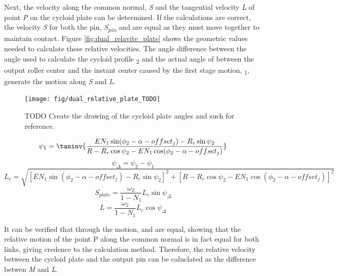 Next, the velocity along the common normal, \textit{S} and the tangential velocity \textit{L} of point \textit{P} on the cycloid plate can be determined. If the calculations are correct, the velocity \textit{S} for both the pin, \textit{S\textsubscript{pin}} and  are equal as they must move together to maintain contact. Figure \ref{fig:dual_relavite_plate} shows the geometric values needed to calculate these relative velocities. The angle difference between the angle used to calculate the cycloid profile \textpsi\textsubscript{2} and the actual angle of between the output roller center and the instant center caused by the first stage motion, \textpsi\textsubscript{1}, generate the motion along \textit{S} and \textit{L}. 

\begin{figure}[h]
	\centering
	\texttt{[image: fig/dual\_relative\_plate\_TODO]}
   \caption{TODO Create the drawing of the cycloid plate angles and such for reference.}
   \label{fig:dual_relative_plate}
\end{figure}

\begin{equation}\label{eq:psi_1}
\psi_1 = \taninv{\frac{E N_1 \sin(\phi_2-\alpha-offset_j) - R_r\sin\psi_2}
{R-R_r\cos\psi_2 - E N_1\cos(\phi_2-\alpha-offset_j)}}
\end{equation}
\begin{equation} \label{eq:psi_delta}
\psi_{\Delta} = \psi_2 - \psi_1
\end{equation}
\begin{equation}\label{eq:L_c}
L_{c} = \sqrt{\left[E N_1 \sin(\phi_2-\alpha-offset_j) - R_r\sin\psi_2\right]^2 + 
\left[R-R_r\cos\psi_2 - E N_1 \cos(\phi_2-\alpha-offset_j)\right]^2}
\end{equation}
\begin{equation}\label{eq:s_plate}
S_{plate} = \frac{\omega_2}{1-N_1} L_c \sin\psi_{\Delta}
\end{equation}
\begin{equation}\label{eq:L}
L = \frac{\omega_2}{1-N_1} L_c \cos\psi_{\Delta}
\end{equation}

It can be verified that through the motion,  and  are equal, showing that the relative motion of the point P along the common normal is in fact equal for both links, giving credence to the calculation method. Therefore, the relative velocity between the cycloid plate and the output pin can be caluclated as the difference betwen \textit{M} and \textit{L}.

